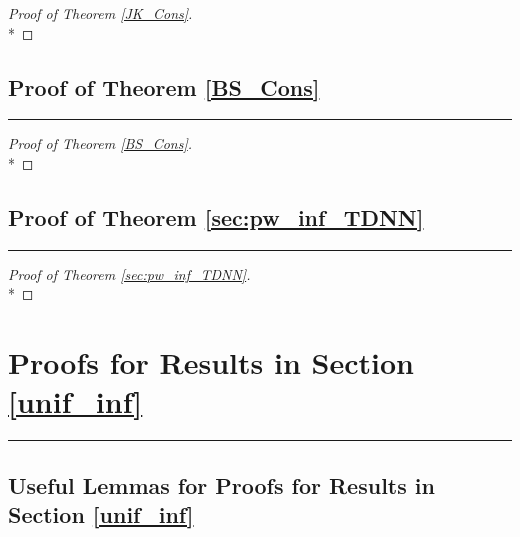 \documentclass[letterpaper,10pt]{article}
\numberwithin{equation}{section}
\numberwithin{thm}{section}
\numberwithin{lem}{section}
\numberwithin{cor}{section}
\newcommand{\1}{\mathbbm{1}}
\begin{document}
\begin{proof}[Proof of Theorem \ref{JK_Cons}]\mbox{}\\*

\end{proof}

\subsection{Proof of Theorem \ref{BS_Cons}}
\hrule

\begin{proof}[Proof of Theorem \ref{BS_Cons}]\mbox{}\\*

\end{proof}

\subsection{Proof of Theorem \ref{sec:pw_inf_TDNN}}
\hrule

\begin{proof}[Proof of Theorem \ref{sec:pw_inf_TDNN}]\mbox{}\\*

\end{proof}

\newpage
\section{Proofs for Results in Section \ref{unif_inf}}
\hrule
\subsection{Useful Lemmas for Proofs for Results in Section \ref{unif_inf}}
\end{document}
